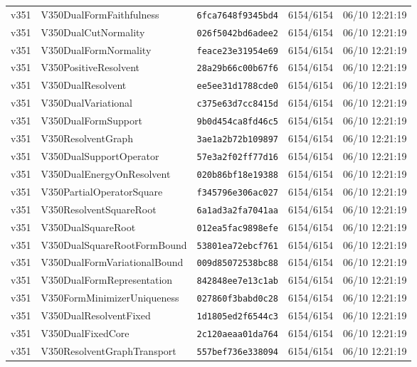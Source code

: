 \documentclass[11pt]{article}
\theoremstyle{definition}\newtheorem{deriv}{Derivation}
\begin{document}
{\begin{longtable}{@{}lllll@{}}
v351 & V350DualFormFaithfulness & \texttt{6fca7648f9345bd4} & 6154/6154 & 06/10 12:21:19 \\
v351 & V350DualCutNormality & \texttt{026f5042bd6adee2} & 6154/6154 & 06/10 12:21:19 \\
v351 & V350DualFormNormality & \texttt{feace23e31954e69} & 6154/6154 & 06/10 12:21:19 \\
v351 & V350PositiveResolvent & \texttt{28a29b66c00b67f6} & 6154/6154 & 06/10 12:21:19 \\
v351 & V350DualResolvent & \texttt{ee5ee31d1788cde0} & 6154/6154 & 06/10 12:21:19 \\
v351 & V350DualVariational & \texttt{c375e63d7cc8415d} & 6154/6154 & 06/10 12:21:19 \\
v351 & V350DualFormSupport & \texttt{9b0d454ca8fd46c5} & 6154/6154 & 06/10 12:21:19 \\
v351 & V350ResolventGraph & \texttt{3ae1a2b72b109897} & 6154/6154 & 06/10 12:21:19 \\
v351 & V350DualSupportOperator & \texttt{57e3a2f02ff77d16} & 6154/6154 & 06/10 12:21:19 \\
v351 & V350DualEnergyOnResolvent & \texttt{020b86bf18e19388} & 6154/6154 & 06/10 12:21:19 \\
v351 & V350PartialOperatorSquare & \texttt{f345796e306ac027} & 6154/6154 & 06/10 12:21:19 \\
v351 & V350ResolventSquareRoot & \texttt{6a1ad3a2fa7041aa} & 6154/6154 & 06/10 12:21:19 \\
v351 & V350DualSquareRoot & \texttt{012ea5fac9898efe} & 6154/6154 & 06/10 12:21:19 \\
v351 & V350DualSquareRootFormBound & \texttt{53801ea72ebcf761} & 6154/6154 & 06/10 12:21:19 \\
v351 & V350DualFormVariationalBound & \texttt{009d85072538bc88} & 6154/6154 & 06/10 12:21:19 \\
v351 & V350DualFormRepresentation & \texttt{842848ee7e13c1ab} & 6154/6154 & 06/10 12:21:19 \\
v351 & V350FormMinimizerUniqueness & \texttt{027860f3babd0c28} & 6154/6154 & 06/10 12:21:19 \\
v351 & V350DualResolventFixed & \texttt{1d1805ed2f6544c3} & 6154/6154 & 06/10 12:21:19 \\
v351 & V350DualFixedCore & \texttt{2c120aeaa01da764} & 6154/6154 & 06/10 12:21:19 \\
v351 & V350ResolventGraphTransport & \texttt{557bef736e338094} & 6154/6154 & 06/10 12:21:19 \\

\end{longtable}}
\end{document}
